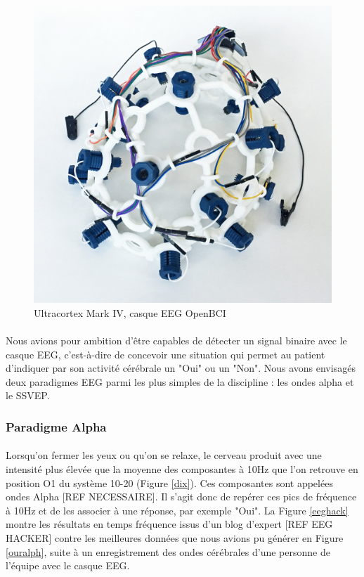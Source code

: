 \documentclass[11pt,a4paper]{article}
\theoremstyle{plain}
\theoremstyle{definition}
\begin{document}
\begin{figure}[h!]
\centering
\includegraphics[scale=0.05]{images/OpenBCI.jpg}
\caption{Ultracortex Mark IV, casque EEG OpenBCI}
\label{openbci}
\end{figure}

\paragraph{} Nous avions pour ambition d'être capables de détecter un signal binaire avec le casque EEG, c'est-à-dire de concevoir une situation qui permet au patient
d'indiquer par son activité cérébrale un "Oui" ou un "Non". Nous avons envisagés deux paradigmes EEG parmi les plus simples de la discipline : les ondes alpha et 
le SSVEP. 

\subsubsection{Paradigme Alpha}

\paragraph{} Lorsqu'on fermer les yeux ou qu'on se relaxe, le cerveau produit avec une intensité plus élevée que la moyenne des composantes à 10Hz que l'on retrouve en position O1 du système 10-20 (Figure \ref{dix}).
Ces composantes sont appelées ondes Alpha [REF NECESSAIRE]. Il s'agit donc de repérer ces pics de fréquence à 10Hz et de les associer à une réponse, par
exemple "Oui". La Figure \ref{eeghack} montre les résultats en temps fréquence issus d'un blog d'expert [REF EEG HACKER] contre les meilleures données que nous avions pu générer en Figure \ref{ouralph}, suite à un enregistrement des ondes cérébrales d'une personne de l'équipe avec le casque EEG.
\end{document}
